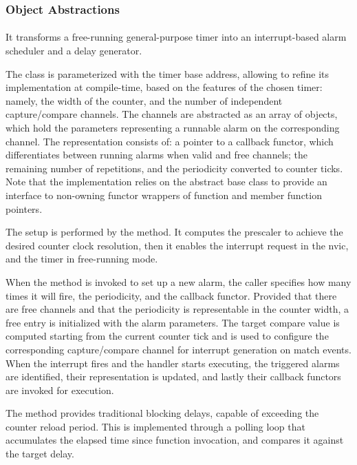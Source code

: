 \subsubsection{Object Abstractions}\label{ssubsec:obj}

\paragraph{} It transforms a free-running general-purpose timer into an interrupt-based alarm scheduler and a delay generator.

The class is parameterized with the timer base address, allowing to refine its implementation at compile-time, based on the features of the chosen timer: namely, the width of the counter, and the number of independent capture/compare channels.
The channels are abstracted as an array of  objects, which hold the parameters representing a runnable alarm on the corresponding channel. The representation consists of: a pointer to a callback functor, which differentiates between running alarms when valid and free channels; the remaining number of repetitions, and the periodicity converted to counter ticks.
Note that the implementation relies on the  abstract base class to provide an interface to non-owning functor wrappers of function and member function pointers.

The setup is performed by the  method. It computes the prescaler to achieve the desired counter clock resolution, then it enables the interrupt request in the \ac{nvic}, and the timer in free-running mode.

When the  method is invoked to set up a new alarm, the caller specifies how many times it will fire, the periodicity, and the callback functor. Provided that there are free channels and that the periodicity is representable in the counter width, a free  entry is initialized with the alarm parameters. The target compare value is computed starting from the current counter tick and is used to configure the corresponding capture/compare channel for interrupt generation on match events. When the interrupt fires and the handler starts executing, the triggered alarms are identified, their representation is updated, and lastly their callback functors are invoked for execution.

The  method provides traditional blocking delays, capable of exceeding the counter reload period. This is implemented through a polling loop that accumulates the elapsed time since function invocation, and compares it against the target delay.

